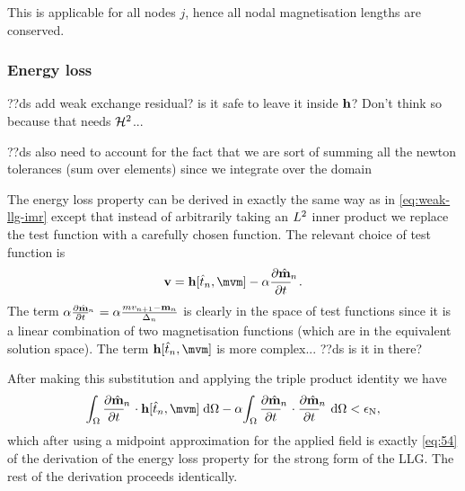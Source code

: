 This is applicable for all nodes $j$, hence all nodal magnetisation lengths are conserved.


\subsubsection{Energy loss}
??ds add weak exchange residual? is it safe to leave it inside $\mathbf{h}$? Don't think so because that needs $\mathcal{H}^2$...

??ds also need to account for the fact that we are sort of summing all the newton tolerances (sum over elements) since we integrate over the domain

The energy loss property can be derived in exactly the same way as in \cref{eq:weak-llg-imr} except that instead of arbitrarily taking an $L^2$ inner product we replace the test function with a carefully chosen function.
The relevant choice of test function is
\begin{equation}
  \testv = \hv[\tm, \mvm] - \dampc \dmdtm.
\end{equation}
The term $\dampc \dmdtm = \dampc\frac{mv_{n+1} - \mv_n}{\dtn}$ is clearly in the space of test functions since it is a linear combination of two magnetisation functions (which are in the equivalent solution space).
The term $\hv[\tm, \mvm]$ is more complex... ??ds is it in there?

After making this substitution and applying the triple product identity we have
\begin{equation}
  \intd{\dmdtm \cdot \hv[\tm, \mvm]} - \dampc \intd{\dmdtm \cdot \dmdtm} < \ntol,
\end{equation}
which after using a midpoint approximation for the applied field is exactly \cref{eq:54} of the derivation of the energy loss property for the strong form of the LLG.
The rest of the derivation proceeds identically.




